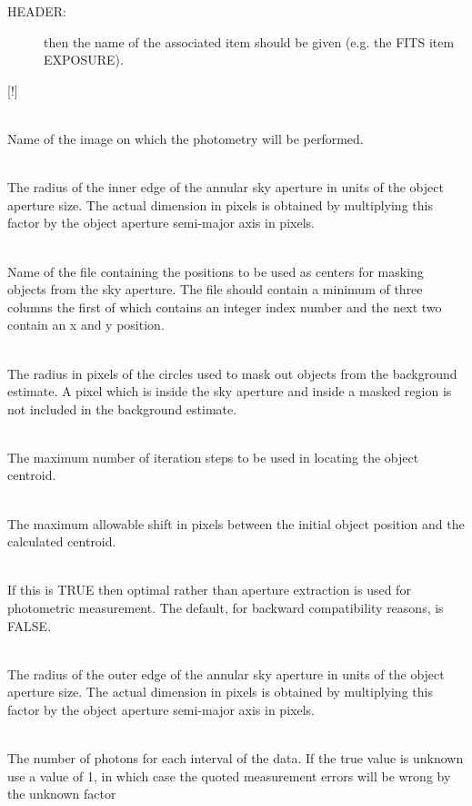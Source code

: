 \documentclass[twoside,11pt]{article}
\renewcommand{\_}{\texttt{\symbol{95}}}
\newcommand{\sstsubsection}[1]{ \item[{#1}] \mbox{} \\}
\newcommand{\sstsubsection}[1]{\item[{#1}]}
\begin{document}
{{{\begin{description}
        \item[HEADER:] then the name of the associated item should be given
          (e.g. the FITS item EXPOSURE).
        \end{description}
        [!]
      }
      \sstsubsection{
         IN = IMAGE (Read)
      }{
         Name of the image on which the photometry will be performed.
      }
      \sstsubsection{
         INNER = \_REAL (Read)
      }{
         The radius of the inner edge of the annular sky aperture in
         units of the object aperture size. The actual dimension in
         pixels is obtained by multiplying this factor by the object
         aperture semi-major axis in pixels.
      }
      \sstsubsection{
         MASKFILE = FILENAME (Read)
      }{
         Name of the file containing the positions to be used as
         centers for masking objects from the sky aperture. The file
         should contain a minimum of three columns the first of which
         contains an integer index number and the next two contain an
         x and y position.
      }
      \sstsubsection{
         MASKRAD = \_REAL (Read)
      }{
         The radius in pixels of the circles used to mask out objects
         from the background estimate. A pixel which is inside the sky
         aperture and inside a masked region is not included in the
         background estimate.
      }
      \sstsubsection{
         MAXITER = \_INTEGER (Read)
      }{
         The maximum number of iteration steps to be used in locating
         the object centroid.
      }
      \sstsubsection{
         MAXSHIFT = \_REAL (Read)
      }{
         The maximum allowable shift in pixels between the initial
         object position and the calculated centroid.
      }
      \sstsubsection{
         OPTIMA = \_LOGICAL (Read)
      }{
         If this is TRUE then optimal rather than aperture extraction
         is used for photometric measurement. The default, for backward
         compatibility reasons, is FALSE.
      }
      \sstsubsection{
         OUTER = \_REAL (Read)
      }{
         The radius of the outer edge of the annular sky aperture in
         units of the object aperture size. The actual dimension in
         pixels is obtained by multiplying this factor by the object
         aperture semi-major axis in pixels.
      }
      \sstsubsection{
         PADU = \_REAL (Read)
      }{
         The number of photons for each interval of the data. If the
         true value is unknown use a value of 1, in which case the
         quoted measurement errors will be wrong by the unknown factor
}}}
\end{document}
